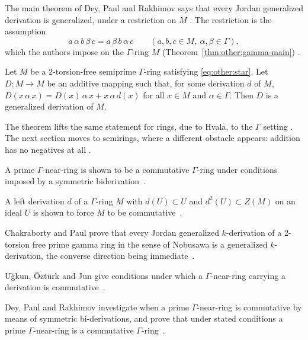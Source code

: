 The main theorem of Dey, Paul and Rakhimov says that every Jordan
generalized derivation is generalized, under a restriction on $M$
\cite[Abstract, p.~1]{DeyPaulRakhimov2012}. The
restriction is the assumption
\begin{equation}\label{eq:other:star}
a\,\alpha\,b\,\beta\,c = a\,\beta\,b\,\alpha\,c
\qquad (a, b, c \in M,\ \alpha, \beta \in \Gamma),
\end{equation}
which the authors impose on the $\Gamma$-ring $M$ (Theorem~\ref{thm:other:gamma-main})
\cite[pp.~1--2]{DeyPaulRakhimov2012}.\begin{theorem}\label{thm:other:gamma-main}
Let $M$ be a $2$-torsion-free semiprime $\Gamma$-ring satisfying
\eqref{eq:other:star}. Let $D \colon M \to M$ be an additive mapping such
that, for some derivation $d$ of $M$,
$D(x\,\alpha\,x) = D(x)\,\alpha\,x + x\,\alpha\,d(x)$ for all $x \in M$
and $\alpha \in \Gamma$. Then $D$ is a generalized derivation of $M$.
\end{theorem}

The theorem lifts the same statement for rings, due to Hvala, to the
$\Gamma$ setting \cite[p.~1]{DeyPaulRakhimov2012}. The next section moves
to semirings, where a different obstacle appears: addition has no
negatives at all \cite[p.~625]{AhmedDudek2021}.

A prime $\Gamma$-near-ring is shown to be a commutative $\Gamma$-ring under conditions imposed by a symmetric biderivation~\cite{WlOnCommutativityIn2014}.

A left derivation $d$ of a $\Gamma$-ring $M$ with $d(U)\subset U$ and $d^2(U)\subset Z(M)$ on an ideal $U$ is shown to force $M$ to be commutative~\cite{WlTheCommutativityInPrimeGammaRi2018}.

Chakraborty and Paul prove that every Jordan generalized $k$-derivation of a 2-torsion free prime gamma ring in the sense of Nobusawa is a generalized $k$-derivation, the converse direction being immediate~\cite{WlOnJordanGeneralizedKDerivation2007}.

U\u{g}kun, \"Ozt\"urk and Jun give conditions under which a $\Gamma$-near-ring carrying a derivation is commutative~\cite{WlOnPrimeGammaNearRingsWithDeriv2004}.

Dey, Paul and Rakhimov investigate when a prime $\Gamma$-near-ring is commutative by means of symmetric bi-derivations, and prove that under stated conditions a prime $\Gamma$-near-ring is a commutative $\Gamma$-ring~\cite{WlOnCommutativityInPrimeGammaNea2014}.
